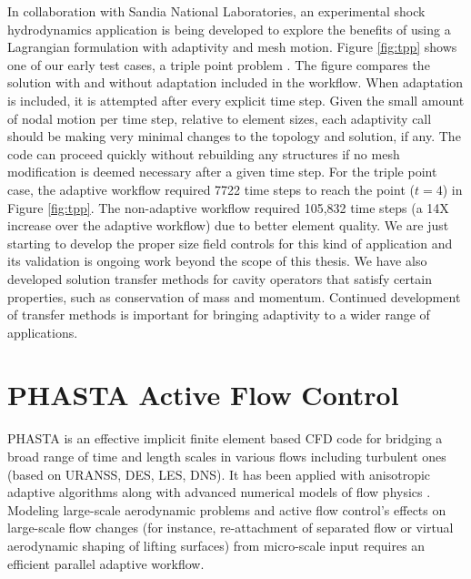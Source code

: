 In collaboration with Sandia National Laboratories, an
experimental shock hydrodynamics application is being developed
to explore the benefits of using a Lagrangian formulation with
adaptivity and mesh motion.
Figure \ref{fig:tpp} shows one of our early test cases,
a triple point problem \cite{del2011metric}.
The figure compares the solution with and without adaptation
included in the workflow.
When adaptation is included, it is attempted after every explicit
time step.
Given the small amount of nodal motion per time step, relative
to element sizes, each adaptivity call should be making very
minimal changes to the topology and solution, if any.
The code can proceed quickly without rebuilding any structures
if no mesh modification is deemed necessary after a given time step.
For the triple point case, the adaptive workflow required
7722 time steps to reach the point ($t=4$) in Figure \ref{fig:tpp}.
The non-adaptive workflow required 105,832 time steps (a 14X increase over the adaptive workflow)
due to better element quality.
We are just starting to develop the proper size field controls
for this kind of application and its validation is ongoing
work beyond the scope of this thesis.
We have also developed solution transfer methods for cavity operators
that satisfy certain properties, such as conservation of
mass and momentum.
Continued development of transfer methods is important for bringing adaptivity to
a wider range of applications.

\section{PHASTA Active Flow Control}
\label{sec:phasta_active}

PHASTA \cite{JanWhi99,WhiJanDey2003} is an effective implicit finite element
based CFD code for bridging a broad range of time and length scales in various
flows including turbulent ones (based on URANSS, DES, LES, DNS). It has been
applied with anisotropic adaptive algorithms \cite{Sahn06,Sahn07,Sahn08,
ovcharenko2013parallel}
along with advanced numerical models of flow physics
\cite{HugLES99,TeJaSUPG,TeJaDFWR2}. Modeling large-scale aerodynamic problems
and active flow control's effects on large-scale flow changes (for instance,
re-attachment of separated flow or virtual aerodynamic shaping of lifting
surfaces) from micro-scale input \cite{Amitay:98,Glezer:02,Sahni:11} requires an
efficient parallel adaptive workflow.

